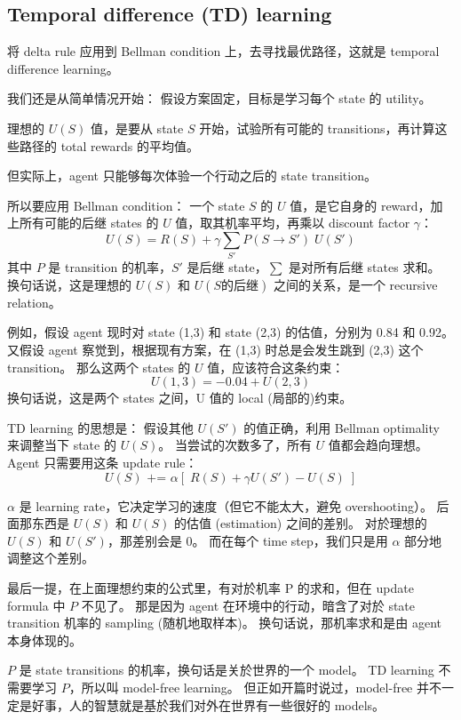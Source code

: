 \subsection{Temporal difference (TD) learning}

将 delta rule 应用到 Bellman condition 上，去寻找最优路径，这就是 temporal difference learning。

我们还是从简单情况开始：  假设方案固定，目标是学习每个 state 的 utility。

理想的 $U(S)$ 值，是要从 state $S$ 开始，试验所有可能的 transitions，再计算这些路径的 total rewards 的平均值。

但实际上，agent 只能够每次体验一个行动之后的 state transition。

所以要应用 Bellman condition： 一个 state $S$ 的 $U$ 值，是它自身的 reward，加上所有可能的后继 states 的 $U$ 值，取其机率平均，再乘以 discount factor $\gamma$：
$$ U(S) = R(S) + \gamma \sum_{S'} P(S \rightarrow S') \; U(S') $$
其中 $P$ 是 transition 的机率，$S'$ 是后继 state，$\sum$ 是对所有后继 states 求和。  换句话说，这是理想的 $U(S)$ 和 $U(S \mbox{的后继})$ 之间的关系，是一个 recursive relation。

例如，假设 agent 现时对 state (1,3) 和 state (2,3) 的估值，分别为 0.84 和 0.92。  又假设 agent 察觉到，根据现有方案，在 (1,3) 时总是会发生跳到 (2,3) 这个 transition。  那么这两个 states 的 $U$ 值，应该符合这条约束：
$$ U(1,3) = -0.04 + U(2,3) $$
换句话说，这是两个 states 之间，U 值的 local (局部的)约束。

TD learning 的思想是：  假设其他 $U(S')$ 的值正确，利用 Bellman optimality 来调整当下 state 的 $U(S)$。 当尝试的次数多了，所有 $U$ 值都会趋向理想。 Agent 只需要用这条 update rule：
$$ U(S) \mbox{  +=  } \alpha [ \; R(S) + \gamma U(S') - U(S) \; ] $$

$\alpha$ 是 learning rate，它决定学习的速度（但它不能太大，避免 overshooting）。  后面那东西是 $U(S)$ 和 $U(S)$ 的估值 (estimation) 之间的差别。  对於理想的 $U(S)$ 和 $U(S')$，那差别会是 0。  而在每个 time step，我们只是用 $\alpha$ 部分地 调整这个差别。

最后一提，在上面理想约束的公式里，有对於机率 P 的求和，但在 update formula 中 $P$ 不见了。  那是因为 agent 在环境中的行动，暗含了对於 state transition 机率的 sampling (随机地取样本)。 换句话说，那机率求和是由 agent 本身体现的。

$P$ 是 state transitions 的机率，换句话是关於世界的一个 model。 TD learning 不需要学习 $P$，所以叫 model-free learning。  但正如开篇时说过，model-free 并不一定是好事，人的智慧就是基於我们对外在世界有一些很好的 models。

